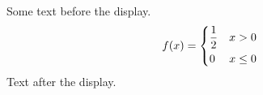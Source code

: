 \documentclass[12pt]{article}
\begin{document}
Some text before the display.
\[ f(x) = \begin{dcases} \frac{1}{2} & x > 0 \\ 0 & x \le 0 \end{dcases} \]
Text after the display.
\end{document}
